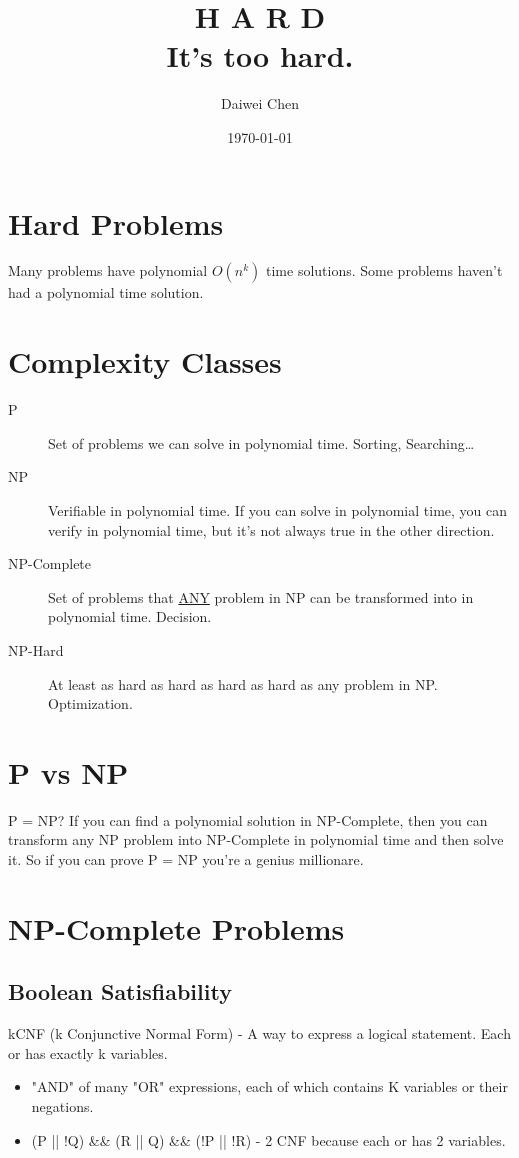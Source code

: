 \documentclass{article}
\author{Daiwei Chen}
\date{\today}
\title{\textbf{H A R D}\\\medskip
\large It's too hard.}
\begin{document}
\maketitle
\tableofcontents


\section{Hard Problems}
\label{sec:orga2400a8}
Many problems have polynomial \(O(n^k)\) time solutions.
Some problems haven't had a polynomial time solution.

\section{Complexity Classes}
\label{sec:org8a47dfa}
\begin{description}
\item[{P}] Set of problems we can solve in polynomial time. Sorting, Searching\ldots{}
\item[{NP}] Verifiable in polynomial time. If you can solve in polynomial time, you can verify in polynomial time, but it's not always true in the other direction.
\item[{NP-Complete}] Set of problems that \uline{ANY} problem in NP can be transformed into in polynomial time. Decision.
\item[{NP-Hard}] At least as hard as hard as hard as hard as any problem in NP. Optimization.
\end{description}

\section{P vs NP}
\label{sec:org58fef01}
P = NP? If you can find a polynomial solution in NP-Complete, then you can transform any NP problem into NP-Complete in polynomial time and then solve it. So if you can prove P = NP you're a genius millionare.

\section{NP-Complete Problems}
\label{sec:orgab0c260}
\subsection{Boolean Satisfiability}
\label{sec:org7cfea6f}
kCNF (k Conjunctive Normal Form) - A way to express a logical statement. Each or has exactly k variables.
\begin{itemize}
\item "AND" of many "OR" expressions, each of which contains K variables or their negations.
\item (P || !Q) \&\& (R || Q) \&\& (!P || !R) - 2 CNF because each or has 2 variables.
\end{itemize}
\end{document}
